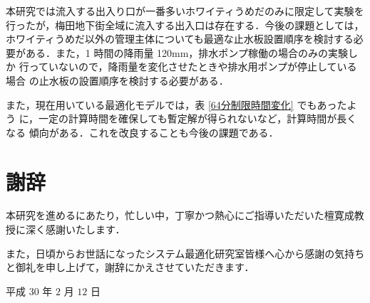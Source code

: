 \documentclass[a4paper,12pt,fleqn]{jarticle}
\begin{document}
本研究では流入する出入り口が一番多いホワイティうめだのみに限定して実験を
行ったが，梅田地下街全域に流入する出入口は存在する．今後の課題としては，
ホワイティうめだ以外の管理主体についても最適な止水板設置順序を検討する必
要がある．また，1 時間の降雨量 120mm，排水ポンプ稼働の場合のみの実験しか
行っていないので，降雨量を変化させたときや排水用ポンプが停止している場合
の止水板の設置順序を検討する必要がある．

また，現在用いている最適化モデルでは，表 \ref{64分制限時間変化} でもあったよう
に，一定の計算時間を確保しても暫定解が得られないなど，計算時間が長くなる
傾向がある．これを改良することも今後の課題である．

\newpage
\section*{謝辞}
本研究を進めるにあたり，忙しい中，丁寧かつ熱心にご指導いただいた檀寛成教授に深く感謝いたします．

また，日頃からお世話になったシステム最適化研究室皆様へ心から感謝の気持ちと御礼を申し上げて，謝辞にかえさせていただきます．
\begin{flushright}
平成 $30$ 年 $2$ 月 $12$ 日
\end{flushright}
\end{document}

